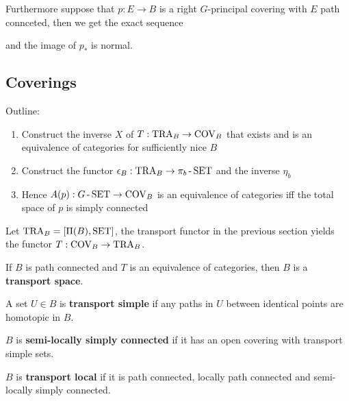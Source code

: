 Furthermore suppose that $p:E\to B$ is a right $G$-principal covering with $E$ path connceted, then we get the exact sequence

\begin{center}
\end{center}

and the image of $p_*$ is normal.

\subsection{Coverings}

Outline:
\begin{enumerate}
    \item Construct the inverse $X$ of $T:\operatorname{TRA}_B\to\operatorname{COV}_B$ that exists and is an equivalence of categories for sufficiently nice $B$
    \item Construct the functor $\epsilon_B:\operatorname{TRA}_B\to\pi_b\operatorname{-}\operatorname{SET}$ and the inverse $\eta_b$
    \item Hence $A(p):G\operatorname{-}\operatorname{SET}\to\operatorname{COV}_B$ is an equivalence of categories iff the total space of $p$ is simply connected
\end{enumerate}

Let $\operatorname{TRA}_B=[\Pi(B),\operatorname{SET}]$, the transport functor in the previous section yields the functor $T:\operatorname{COV}_B\to\operatorname{TRA}_B$.

If $B$ is path connected and $T$ is an equivalence of categories, then $B$ is a \textbf{transport space}.

A set $U\in B$ is \textbf{transport simple} if any paths in $U$ between identical points are homotopic in $B$.

$B$ is \textbf{semi-locally simply connected} if it has an open covering with transport simple sets.

$B$ is \textbf{transport local} if it is path connected, locally path connected and semi-locally simply connected.

